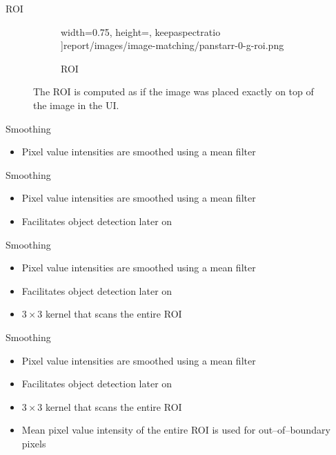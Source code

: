 \begin{frame}{ROI}
\begin{figure}[H]
\begin{subfigure}{.5\textwidth}
                width=0.75\textwidth,
                height=\textheight,
                keepaspectratio
          ]{report/images/image-matching/panstarr-0-g-roi.png}
          \caption{\panstarrs ROI}
        \end{subfigure}
        \caption{The ROI is computed as if the \panstarrs image was placed exactly on top of the \usno image in the UI.}
    \end{figure}
\end{frame}

\begin{frame}{Smoothing}
    \begin{itemize}
        \item Pixel value intensities are smoothed using a mean filter
    \end{itemize}
\end{frame}

\begin{frame}{Smoothing}
    \begin{itemize}
        \item Pixel value intensities are smoothed using a mean filter
        \item Facilitates object detection later on
    \end{itemize}
\end{frame}

\begin{frame}{Smoothing}
    \begin{itemize}
        \item Pixel value intensities are smoothed using a mean filter
        \item Facilitates object detection later on
        \item $3 \times 3$ kernel that scans the entire ROI
    \end{itemize}
\end{frame}

\begin{frame}{Smoothing}
    \begin{itemize}
        \item Pixel value intensities are smoothed using a mean filter
        \item Facilitates object detection later on
        \item $3 \times 3$ kernel that scans the entire ROI
        \item Mean pixel value intensity of the entire ROI is used for out--of--boundary pixels
    \end{itemize}
\end{frame}

